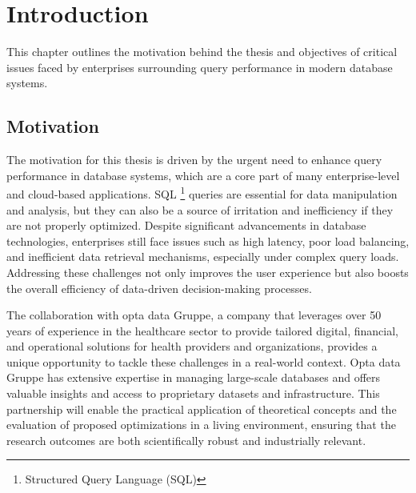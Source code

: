 \section{Introduction}
This chapter outlines the motivation behind the thesis and objectives of critical issues faced by enterprises surrounding query performance in modern database systems.
\subsection{Motivation}
The motivation for this thesis is driven by the urgent need to enhance query performance in database systems, which are a core part of many enterprise-level and cloud-based applications. SQL \footnote{Structured Query Language (SQL)} queries are essential for data manipulation and analysis, but they can also be a source of irritation and inefficiency if they are not properly optimized. Despite significant advancements in database technologies, enterprises still face issues such as high latency, poor load balancing, and inefficient data retrieval mechanisms, especially under complex query loads. Addressing these challenges not only improves the user experience but also boosts the overall efficiency of data-driven decision-making processes.\vspace{.4cm}

The collaboration with opta data Gruppe, a company that leverages over 50 years of experience in the healthcare sector to provide tailored digital, financial, and operational solutions for health providers and organizations, provides a unique opportunity to tackle these challenges in a real-world context. Opta data Gruppe has extensive expertise in managing large-scale databases and offers valuable insights and access to proprietary datasets and infrastructure. This partnership will enable the practical application of theoretical concepts and the evaluation of proposed optimizations in a living environment, ensuring that the research outcomes are both scientifically robust and industrially relevant. \vspace{.4cm}

